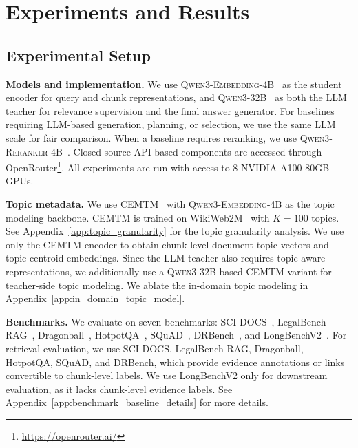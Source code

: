 \section{Experiments and Results}

\subsection{Experimental Setup}
\label{sec:experimental_setup}

\noindent
\textbf{Models and implementation. }
We use \textsc{Qwen3-Embedding-4B}~\citep{zhang2025qwen3embeddingadvancingtext} as the student encoder for query and chunk representations, and \textsc{Qwen3-32B}~\citep{qwen3technicalreport} as both the LLM teacher for relevance supervision and the final answer generator. For baselines requiring LLM-based generation, planning, or selection, we use the same LLM scale for fair comparison. When a baseline requires reranking, we use \textsc{Qwen3-Reranker-4B}~\citep{zhang2025qwen3embeddingadvancingtext}. Closed-source API-based components are accessed through OpenRouter\footnote{\url{https://openrouter.ai/}}. All experiments are run with access to 8 NVIDIA A100 80GB GPUs.

\noindent
\textbf{Topic metadata. }
We use CEMTM~\cite{abaskohi-etal-2025-cemtm} with \textsc{Qwen3-Embedding-4B} as the topic modeling backbone. CEMTM is trained on WikiWeb2M~\cite{burns2023wiki} with $K=100$ topics. See Appendix~\ref{app:topic_granularity} for the topic granularity analysis. We use only the CEMTM encoder to obtain chunk-level document-topic vectors and topic centroid embeddings. Since the LLM teacher also requires topic-aware representations, we additionally use a \textsc{Qwen3-32B}-based CEMTM variant for teacher-side topic modeling. We ablate the in-domain topic modeling in Appendix~\ref{app:in_domain_topic_model}.

\noindent
\textbf{Benchmarks. }
We evaluate on seven benchmarks: SCI-DOCS~\cite{cohan-etal-2020-specter}, LegalBench-RAG~\cite{pipitone2024legalbenchragbenchmarkretrievalaugmentedgeneration}, Dragonball~\cite{zhu-etal-2025-rageval}, HotpotQA~\cite{yang-etal-2018-hotpotqa}, SQuAD~\cite{rajpurkar-etal-2016-squad}, DRBench~\cite{abaskohi2026drbench}, and LongBenchV2~\cite{bai-etal-2025-longbench}. For retrieval evaluation, we use SCI-DOCS, LegalBench-RAG, Dragonball, HotpotQA, SQuAD, and DRBench, which provide evidence annotations or links convertible to chunk-level labels. We use LongBenchV2 only for downstream evaluation, as it lacks chunk-level evidence labels. See Appendix~\ref{app:benchmark_baseline_details} for more details.

